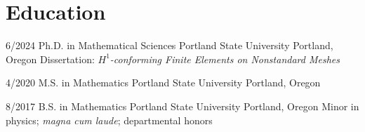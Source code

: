 \section{Education}

\cventry
{6/2024}
{Ph.D. in Mathematical Sciences}
{Portland State University}
{Portland, Oregon}
{}
{Dissertation: \textit{$H^1$-conforming Finite Elements on Nonstandard Meshes}}

\cventry
{4/2020}
{M.S. in Mathematics}
{Portland State University}
{Portland, Oregon}
{}
{}

\cventry
{8/2017}
{B.S. in Mathematics}
{Portland State University}
{Portland, Oregon}
{}
{Minor in physics; \textit{magna cum laude}; departmental honors}
